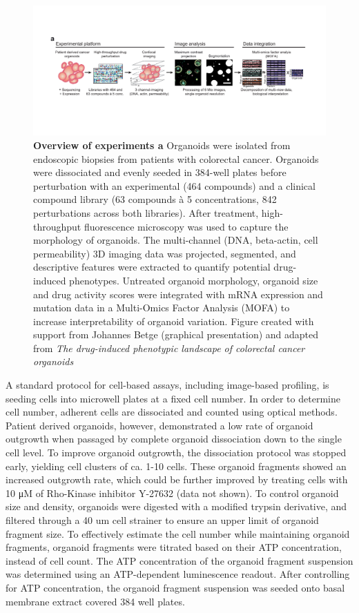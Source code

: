 \begin{flushleft}
\begin{figure}[h]
\centering
\includegraphics[width=\textwidth,
                height=\textheight,
                keepaspectratio]{figures/promise/pdf/fig_1_1.pdf}
\caption{\textbf{Overview of experiments a} Organoids were isolated from endoscopic biopsies from patients with colorectal cancer. Organoids were dissociated and evenly seeded in 384-well plates before perturbation with an experimental (464 compounds) and a clinical compound library (63 compounds à 5 concentrations, 842 perturbations across both libraries). After treatment, high-throughput fluorescence microscopy was used to capture the morphology of organoids.  The multi-channel (DNA, beta-actin, cell permeability) 3D imaging data was projected, segmented, and descriptive features were extracted to quantify potential drug-induced phenotypes. Untreated organoid morphology, organoid size and drug activity scores were integrated with mRNA expression and mutation data in a Multi-Omics Factor Analysis (MOFA) to increase interpretability of organoid variation. Figure created with support from Johannes Betge (graphical presentation) and adapted from \textit{The drug-induced phenotypic landscape of colorectal cancer organoids} \cite{Betge2022-kr}}
\label{fig_130}
\end{figure}


A standard protocol for cell-based assays, including image-based profiling, is seeding cells into microwell plates at a fixed cell number. In order to determine cell number, adherent cells are dissociated and counted using optical methods. Patient derived organoids, however, demonstrated a low rate of organoid outgrowth when passaged by complete organoid dissociation down to the single cell level. To improve organoid outgrowth, the dissociation protocol was stopped early, yielding cell clusters of ca. 1-10 cells. These organoid fragments showed an increased outgrowth rate, which could be further improved by treating cells with 10 μM of Rho-Kinase inhibitor Y-27632 (data not shown). To control organoid size and density, organoids were digested with a modified trypsin derivative, and filtered through a 40 um cell strainer to ensure an upper limit of organoid fragment size. To effectively estimate the cell number while maintaining organoid fragments, organoid fragments were titrated based on their ATP concentration, instead of cell count. The ATP concentration of the organoid fragment suspension was determined using an ATP-dependent luminescence readout. After controlling for ATP concentration, the organoid fragment suspension was seeded onto basal membrane extract covered 384 well plates.


\end{flushleft}
